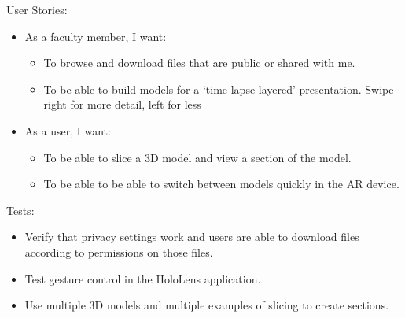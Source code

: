 User Stories:
\begin{itemize}
	\item As a faculty member, I want:
	\begin{itemize}
		\item To browse and download files that are public or shared with me.
		\item To be able to build models for a ‘time lapse layered’ 
		presentation. Swipe right for more detail, left for less
	\end{itemize}
	\item As a user, I want: 
	\begin{itemize}
		\item To be able to slice a 3D model and view a section of the model.
		\item To be able to be able to switch between models quickly in the AR 
		device.
	\end{itemize}
\end{itemize}
Tests:
\begin{itemize}
	\item Verify that privacy settings work and users are able to download files
	according to permissions on those files.
	\item Test gesture control in the HoloLens application.
	\item Use multiple 3D models and multiple examples of slicing to create 
	sections.
\end{itemize}